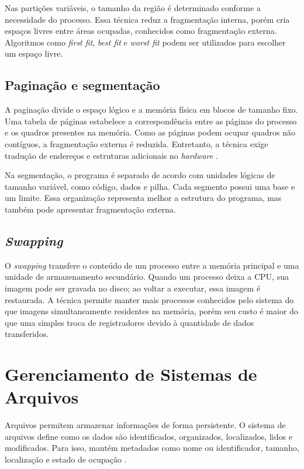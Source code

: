 \documentclass[
    12pt,
    openright,
    a4paper,
    english,
    brazilian
]{abntex2}
\begin{document}
Nas partições variáveis, o tamanho da região é determinado conforme a necessidade do processo. Essa técnica reduz a fragmentação interna, porém cria espaços livres entre áreas ocupadas, conhecidos como fragmentação externa. Algoritmos como \emph{first fit}, \emph{best fit} e \emph{worst fit} podem ser utilizados para escolher um espaço livre.

\subsection{Paginação e segmentação}

A paginação divide o espaço lógico e a memória física em blocos de tamanho fixo. Uma tabela de páginas estabelece a correspondência entre as páginas do processo e os quadros presentes na memória. Como as páginas podem ocupar quadros não contíguos, a fragmentação externa é reduzida. Entretanto, a técnica exige tradução de endereços e estruturas adicionais no \emph{hardware} \cite{arpaci2018,bryant2016}.

Na segmentação, o programa é separado de acordo com unidades lógicas de tamanho variável, como código, dados e pilha. Cada segmento possui uma base e um limite. Essa organização representa melhor a estrutura do programa, mas também pode apresentar fragmentação externa.

\subsection{\emph{Swapping}}

O \emph{swapping} transfere o conteúdo de um processo entre a memória principal e uma unidade de armazenamento secundário. Quando um processo deixa a CPU, sua imagem pode ser gravada no disco; ao voltar a executar, essa imagem é restaurada. A técnica permite manter mais processos conhecidos pelo sistema do que imagens simultaneamente residentes na memória, porém seu custo é maior do que uma simples troca de registradores devido à quantidade de dados transferidos.

\section{Gerenciamento de Sistemas de Arquivos}

Arquivos permitem armazenar informações de forma persistente. O sistema de arquivos define como os dados são identificados, organizados, localizados, lidos e modificados. Para isso, mantém metadados como nome ou identificador, tamanho, localização e estado de ocupação \cite{tanenbaum2016}.
\end{document}
